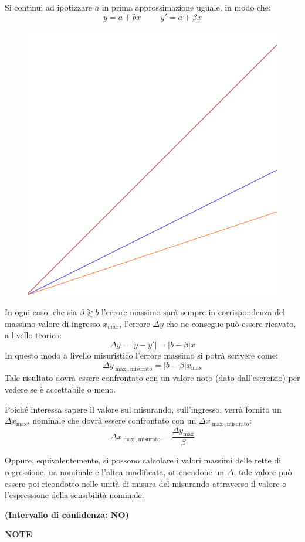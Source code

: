 \documentclass[a4paper, 15pt]{article}
\begin{document}
\begin{adjustwidth}{2in}{}
	Si continui ad ipotizzare $a$ in prima approssimazione uguale, in modo che: 
	\[ y = a + bx \hspace{1cm} y'= a + \beta x\]	
\begin{figure}[H]
	\centering
	\includegraphics[width=0.3\linewidth]{fig/rettine}
	\label{fig:rettine}
\end{figure}	
	In ogni caso, che sia $\beta\gtrless b$ l'errore massimo sarà sempre in corrispondenza del massimo valore di ingresso $x_{max}$, l'errore $\Delta y$ che ne consegue può essere ricavato, a livello teorico: 
	\[\Delta y = \left|y-y'\right| = \left|b-\beta\right|x\]
	In questo modo a livello misuristico l'errore massimo si potrà scrivere come:
	\[\Delta y_{\max, \text{misurato}} = \left|b-\beta\right|x_{\max}\] 
	Tale risultato dovrà essere confrontato con un valore noto (dato dall'esercizio) per vedere se è accettabile o meno. 
	
	Poiché interessa sapere il valore sul misurando, sull'ingresso, verrà fornito un $\Delta x_{\max} $, nominale che dovrà essere confrontato con un $\Delta x_{\max, \text{misurato}}$:
	\[\Delta x_{\max, \text{misurato}} = \dfrac{\Delta y_{\max}}{\beta}\]
	
	Oppure, equivalentemente, si possono calcolare i valori massimi delle rette di regressione, ua nominale e l'altra modificata, ottenendone un $\Delta$, tale valore può essere poi ricondotto nelle unità di misura del misurando attraverso il valore o l'espressione della sensibilità nominale. 
		
	\textbf{(Intervallo di confidenza: NO)
	}
	
\newpage

{\LARGE \textbf{NOTE}}
	
\end{adjustwidth}
\end{document}
